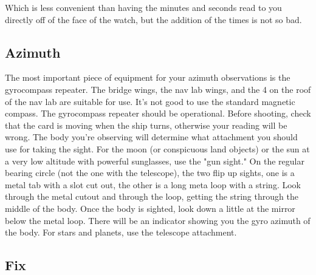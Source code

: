 \documentclass[letterpaper,12pt]{article}
\begin{document}
\bigskip

Which is less convenient than having the minutes and seconds read to you directly off of the face of the watch, but the addition of the times is not so bad.
\subsection{Azimuth}
The most important piece of equipment for your azimuth observations is the gyrocompass repeater. The bridge wings, the nav lab wings, and the 4 on the roof of the nav lab are suitable for use.
It's not good to use the standard magnetic compass.
The gyrocompass repeater should be operational.
Before shooting, check that the card is moving when the ship turns, otherwise your reading will be wrong.
The body you're observing will determine what attachment you should use for taking the sight.
For the moon (or conspicuous land objects) or the sun at a very low altitude with powerful sunglasses, use the "gun sight."
On the regular bearing circle (not the one with the telescope), the two flip up sights, one is a metal tab with a slot cut out, the other is a long meta loop with a string.
Look through the metal cutout and through the loop, getting the string through the middle of the body.
Once the body is sighted, look down a little at the mirror below the metal loop.
There will be an indicator showing you the gyro azimuth of the body.
For stars and planets, use the telescope attachment.
\subsection{Fix}
\end{document}
